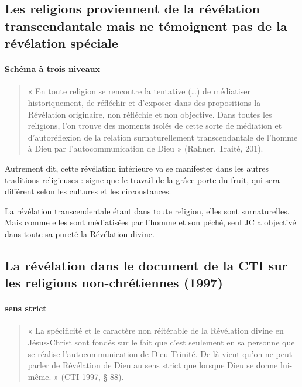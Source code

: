 \subsection{Les religions proviennent de la révélation transcendantale mais ne témoignent pas de la révélation spéciale }
 
 
 \paragraph{Schéma à trois niveaux}
 \begin{quote}
     « En toute religion se rencontre la tentative (…) de médiatiser historiquement, de réfléchir et d’exposer dans des propositions la Révélation originaire, non réfléchie et non objective. Dans toutes les religions, l’on trouve des moments isolés de cette sorte de médiation et d’autoréflexion de la relation surnaturellement transcendantale de l’homme à Dieu par l’autocommunication de Dieu » (Rahner, Traité, 201). 
 \end{quote}

Autrement dit, cette révélation intérieure va se manifester dans les autres traditions religieuses : signe que le travail de la grâce porte du fruit, qui sera différent selon les cultures et les circonstances.

La révélation transcendentale étant dans toute religion, elles sont surnaturelles. Mais comme elles sont médiatisées par l'homme et son péché, seul JC a objectivé dans toute sa pureté la Révélation divine.


\subsection{La révélation dans le document de la CTI sur les religions non-chrétiennes (1997) }

\paragraph{sens strict}
\begin{quote}
    «  La spécificité et le caractère non réitérable de la Révélation divine en Jésus-Christ sont fondés sur le fait que c’est seulement en sa personne que se réalise l’autocommunication de Dieu Trinité. De là vient qu’on ne peut parler de Révélation de Dieu au sens strict que lorsque Dieu se donne lui-même. » (CTI 1997, § 88). 
\end{quote}

